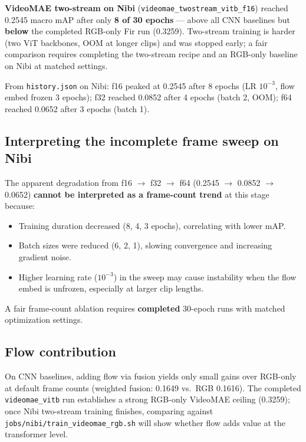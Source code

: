 \documentclass[11pt,a4paper]{article}
\begin{document}
\textbf{VideoMAE two-stream on Nibi} (\texttt{videomae\_twostream\_vitb\_f16}) reached
0.2545 macro mAP after only \textbf{8 of 30 epochs} --- above all CNN baselines but
\textbf{below} the completed RGB-only Fir run (0.3259). Two-stream training is harder
(two ViT backbones, OOM at longer clips) and was stopped early; a fair comparison
requires completing the two-stream recipe and an RGB-only baseline on Nibi at matched
settings.

From \texttt{history.json} on Nibi: f16 peaked at 0.2545 after 8 epochs (LR $10^{-3}$,
flow embed frozen 3 epochs); f32 reached 0.0852 after 4 epochs (batch 2, OOM); f64
reached 0.0652 after 3 epochs (batch 1).

\subsection{Interpreting the incomplete frame sweep on Nibi}

The apparent degradation from f16 $\rightarrow$ f32 $\rightarrow$ f64
(0.2545 $\rightarrow$ 0.0852 $\rightarrow$ 0.0652) \textbf{cannot be interpreted as a
frame-count trend} at this stage because:

\begin{itemize}[noitemsep]
  \item Training duration decreased (8, 4, 3 epochs), correlating with lower mAP.
  \item Batch sizes were reduced (6, 2, 1), slowing convergence and increasing gradient noise.
  \item Higher learning rate ($10^{-3}$) in the sweep may cause instability when the flow
        embed is unfrozen, especially at larger clip lengths.
\end{itemize}

A fair frame-count ablation requires \textbf{completed} 30-epoch runs with matched
optimization settings.

\subsection{Flow contribution}

On CNN baselines, adding flow via fusion yields only small gains over RGB-only at default
frame counts (weighted fusion: 0.1649 vs.\ RGB 0.1616). The completed
\texttt{videomae\_vitb} run establishes a strong RGB-only VideoMAE ceiling (0.3259);
once Nibi two-stream training finishes, comparing against
\texttt{jobs/nibi/train\_videomae\_rgb.sh} will show whether flow adds value at the
transformer level.
\end{document}
